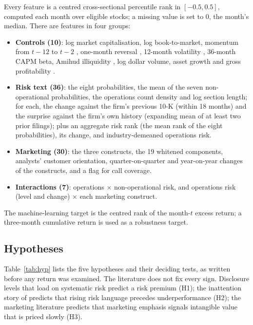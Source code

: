 \documentclass[11pt,a4paper]{article}
\begin{document}
Every feature is a centred cross-sectional percentile rank in $[-0.5,0.5]$, computed each month over eligible stocks; a
missing value is set to 0, the month's median. There are \NFeatures{} features in four groups:
\begin{itemize}
  \item \textbf{Controls (10)}: log market capitalisation, log book-to-market, momentum from $t-12$ to $t-2$
  \citep{jegadeesh1993}, one-month reversal \citep{jegadeesh1990}, 12-month volatility \citep{ang2006}, 36-month CAPM beta,
  Amihud illiquidity \citep{amihud2002}, log dollar volume, asset growth \citep{cooper2008} and gross profitability
  \citep{novymarx2013}.
  \item \textbf{Risk text (36)}: the eight probabilities, the mean of the seven non-operational probabilities, the operations
  count density and log section length; for each, the change against the firm's previous 10-K (within 18 months) and the
  surprise against the firm's own history (expanding mean of at least two prior filings); plus an aggregate risk rank
  (the mean rank of the eight probabilities), its change, and industry-demeaned operations risk.
  \item \textbf{Marketing (30)}: the three constructs, the 19 whitened components, analysts' customer orientation,
  quarter-on-quarter and year-on-year changes of the constructs, and a flag for call coverage.
  \item \textbf{Interactions (7)}: operations $\times$ non-operational risk, and operations risk (level and change)
  $\times$ each marketing construct.
\end{itemize}
The machine-learning target is the centred rank of the month-$t$ excess return; a three-month cumulative return is used
as a robustness target.

\subsection{Hypotheses}

Table~\ref{tab:hyp} lists the five hypotheses and their deciding tests, as written before any return was examined. The
literature does not fix every sign. Disclosure levels that load on systematic risk \citep{campbell2014} predict a risk
premium (H1); the inattention story of \citet{cohen2020} predicts that rising risk language precedes underperformance (H2);
the marketing literature predicts that marketing emphasis signals intangible value that is priced slowly (H3).
\end{document}
